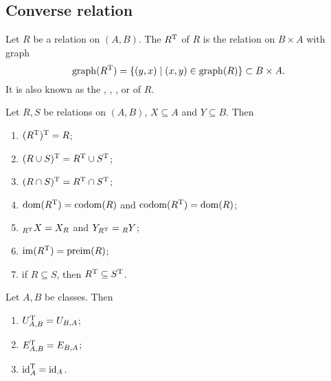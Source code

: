 \subsection{Converse relation}
\begin{definition}
Let $R$ be a relation on $(A, B)$. The  $R^{\mathrm{T}}$ of $R$ is the relation on $B\times A$ with graph
\[ \operatorname{graph}(R^{\mathrm{T}}) = \left\{ (y,x) \;\middle|\; (x,y)\in \operatorname{graph}(R) \right\} \subset B\times A. \]
It is also known as the , , ,  or  of $R$.
\end{definition}

\begin{lemma}
Let $R,S$ be relations on $(A, B)$, $X\subseteq A$ and $Y\subseteq B$. Then
\begin{enumerate}
\item $(R^{\mathrm{T}})^{\mathrm{T}} = R$;
\item $(R \cup S)^{\mathrm{T}} = R^{\mathrm{T}} \cup S^{\mathrm{T}}$;
\item $(R \cap S)^{\mathrm{T}} = R^{\mathrm{T}} \cap S^{\mathrm{T}}$;
\item $\operatorname{dom}(R^{\mathrm{T}}) = \operatorname{codom}(R)$ and $\operatorname{codom}(R^{\mathrm{T}}) = \operatorname{dom}(R)$;
\item $_{R^{\mathrm{T}}}X = X_R$ and $Y_{R^{\mathrm{T}}} = {_RY}$;
\item $\operatorname{im}(R^{\mathrm{T}}) = \operatorname{preim}(R)$;
\item if $R\subseteq S$, then $R^{\mathrm{T}} \subseteq S^{\mathrm{T}}$.
\end{enumerate}
\end{lemma}

\begin{lemma}
Let $A,B$ be classes. Then
\begin{enumerate}
\item $U_{A,B}^{\mathrm{T}} = U_{B,A}$;
\item $E_{A,B}^{\mathrm{T}} = E_{B,A}$;
\item $\operatorname{id}_A^{\mathrm{T}} = \operatorname{id}_A$.
\end{enumerate}
\end{lemma}

